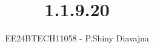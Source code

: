 \documentclass[journal]{IEEEtran}
\begin{document}

\vspace{3cm}

\title{1.1.9.20}
\author{EE24BTECH11058 - P.Shiny Diavajna}
{\let\newpage\relax\maketitle}

\renewcommand{\thefigure}{\theenumi}
\renewcommand{\thetable}{\theenumi}
\setlength{\intextsep}{10pt} %


\renewcommand{\thetable}{\theenumi}
\end{document}
